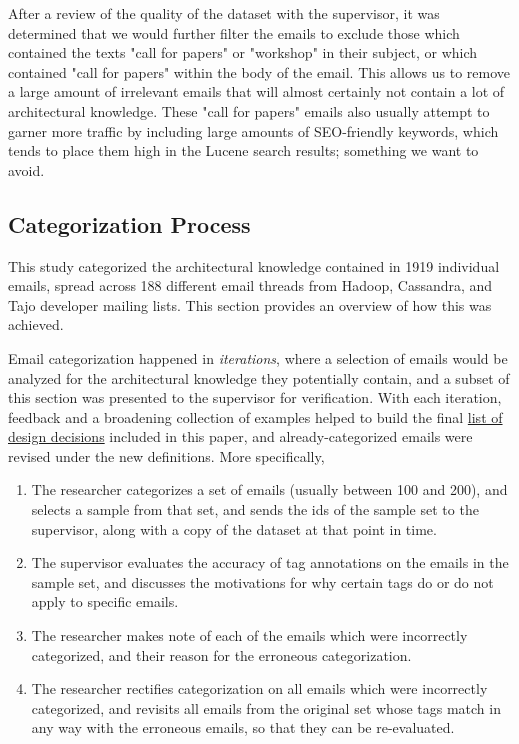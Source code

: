 \documentclass[a4paper, 12pt]{article}
\begin{document}
			After a review of the quality of the dataset with the supervisor, it was determined that we would further filter the emails to exclude those which contained the texts "call for papers" or "workshop" in their subject, or which contained "call for papers" within the body of the email. This allows us to remove a large amount of irrelevant emails that will almost certainly not contain a lot of architectural knowledge. These "call for papers" emails also usually attempt to garner more traffic by including large amounts of SEO-friendly keywords, which tends to place them high in the Lucene search results; something we want to avoid.
	
	\subsection{Categorization Process}
		This study categorized the architectural knowledge contained in 1919 individual emails, spread across 188 different email threads from Hadoop, Cassandra, and Tajo developer mailing lists. This section provides an overview of how this was achieved.
		
		Email categorization happened in \textit{iterations}, where a selection of emails would be analyzed for the architectural knowledge they potentially contain, and a subset of this section was presented to the supervisor for verification. With each iteration, feedback and a broadening collection of examples helped to build the final \hyperref[sec:design-decisions]{list of design decisions} included in this paper, and already-categorized emails were revised under the new definitions. More specifically,
		
		\begin{enumerate}
			\item The researcher categorizes a set of emails (usually between 100 and 200), and selects a sample from that set, and sends the ids of the sample set to the supervisor, along with a copy of the dataset at that point in time.
			\item The supervisor evaluates the accuracy of tag annotations on the emails in the sample set, and discusses the motivations for why certain tags do or do not apply to specific emails.
			\item The researcher makes note of each of the emails which were incorrectly categorized, and their reason for the erroneous categorization.
			\item The researcher rectifies categorization on all emails which were incorrectly categorized, and revisits all emails from the original set whose tags match in any way with the erroneous emails, so that they can be re-evaluated.
		\end{enumerate}
		
\end{document}
